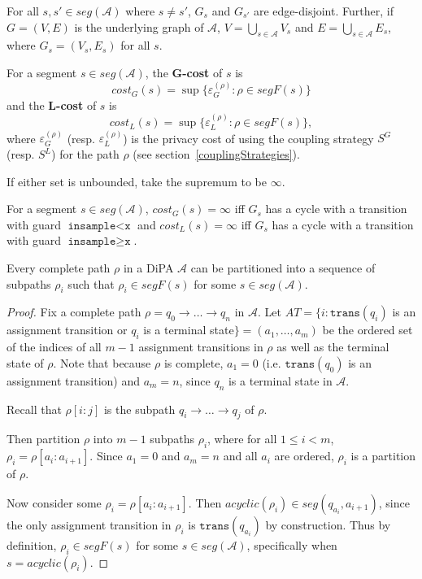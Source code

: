 \documentclass[12pt]{article}
\newcommand{\gguard}[1][x]{\texttt{insample}\geq \texttt{#1}}
\newcommand{\lguard}[1][x]{\texttt{insample} < \texttt{#1}}
\newcommand{\trans}{\texttt{trans}}
\theoremstyle{definition}
\begin{document}
\begin{prop}
	For all $s, s'\in seg(\mathcal{A})$ where $s\neq s'$, $G_s$ and $G_{s'}$ are edge-disjoint. Further, if $G = (V, E)$ is the underlying graph of $\mathcal{A}$, $V = \bigcup_{s\in \mathcal{A}}V_s$ and $E = \bigcup_{s\in \mathcal{A}}E_s$, where $G_s = (V_s, E_s)$ for all $s$.
\end{prop}

\begin{defn}
	For a segment $s\in seg(\mathcal{A})$, the \textbf{G-cost} of $s$ is \[
		cost_G(s) = \sup\{\varepsilon^{(\rho)}_G: \rho\in segF(s)\}
	\]
	and the \textbf{L-cost} of $s$ is \[
		cost_L(s) = \sup\{\varepsilon^{(\rho)}_L: \rho\in segF(s)\},
	\]
	where $\varepsilon^{(\rho)}_G$ (resp. $\varepsilon^{(\rho)}_L$) is the privacy cost of using the coupling strategy $S^G$ (resp. $S^L$) for the path $\rho$ (see section~\ref{couplingStrategies}).

	If either set is unbounded, take the supremum to be $\infty$. 
\end{defn}
\begin{prop}\label{infinitecostcycleonlyprop}
	For a segment $s\in seg(\mathcal{A})$, $cost_G(s)= \infty$ iff $G_s$ has a cycle with a transition with guard $\lguard$ and $cost_L(s)= \infty$ iff $G_s$ has a cycle with a transition with guard $\gguard$.
\end{prop}

\begin{prop}\label{partitionPathProp}
	Every complete path $\rho$ in a DiPA $\mathcal{A}$ can be partitioned into a sequence of subpaths $\rho_i$ such that $\rho_i \in segF(s)$ for some $s\in seg(\mathcal{A})$.
\end{prop}

\begin{proof}
	Fix a complete path $\rho = q_0\to\ldots\to q_n$ in $\mathcal{A}$. Let $AT=\{i: \trans(q_i)$ is an assignment transition or $q_i$ is a terminal state$\} = (a_1, \ldots, a_m)$ be the ordered set of the indices of all $m-1$ assignment transitions in $\rho$ as well as the terminal state of $\rho$. Note that because $\rho$ is complete, $a_1 = 0$ (i.e. $\trans(q_0)$ is an assignment transition) and $a_m = n$, since $q_n$ is a terminal state in $\mathcal{A}$.

	Recall that $\rho[i:j]$ is the subpath $q_i\to\ldots \to q_j$ of $\rho$. 

	Then partition $\rho$ into $m-1$ subpaths $\rho_i$, where for all $1\leq i < m$, $\rho_i = \rho[a_i:a_{i+1}]$. Since $a_1 = 0$ and $a_m = n$ and all $a_i$ are ordered, $\rho_i$ is a partition of $\rho$. 

	Now consider some $\rho_i = \rho[a_i:a_{i+1}]$. Then $acyclic(\rho_i)\in seg(q_{a_i}, a_{i+1})$, since the only assignment transition in $\rho_i$ is $\trans(q_{a_i})$ by construction. Thus by definition, $\rho_i \in segF(s)$ for some $s\in seg(\mathcal{A})$, specifically when $s = acyclic(\rho_i)$. 
\end{proof}
\end{document}

